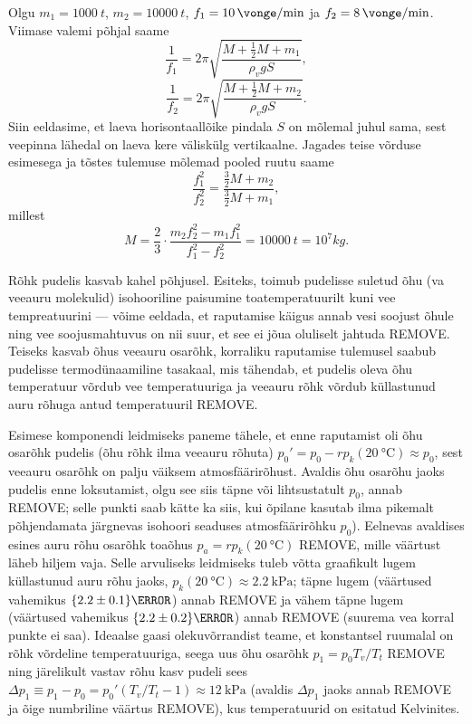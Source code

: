 \documentclass[10pt]{article}
\newcommand{\p}[1]{REMOVE}
\begin{document}
\DeclareSIUnit{}
Olgu $m_1=\SI{1000}{t}$, $m_2=\SI{10000}{t}$, $f_1=\SI{10}{\vonge \per \minute}$ ja $f_2=\SI{8}{\vonge \per \minute}$.
Viimase valemi põhjal saame
\[\frac{1}{f_1}=2\pi\sqrt{\frac{M+\frac{1}{2}M+m_1}{\rho_vgS}},\]
\[\frac{1}{f_2}=2\pi\sqrt{\frac{M+\frac{1}{2}M+m_2}{\rho_vgS}}.\]
Siin eeldasime, et laeva horisontaallõike pindala $S$ on mõlemal juhul sama, sest veepinna lähedal on laeva kere väliskülg vertikaalne.
Jagades teise võrduse esimesega ja tõstes tulemuse mõlemad pooled ruutu saame
\[\frac{f_1^2}{f_2^2}=\frac{\frac{3}{2}M+m_2}{\frac{3}{2}M+m_1},\]
millest
\[M=\frac{2}{3}\cdot\frac{m_2f_2^2-m_1f_1^2}{f_1^2-f_2^2}=\SI{10000}{t}=10^7\si{kg}.\]
\probend
\bigskip


\solu
Rõhk pudelis kasvab kahel põhjusel. Esiteks, toimub pudelisse suletud õhu (va veeauru molekulid) isohooriline paisumine toatemperatuurilt kuni vee tempreatuurini --- võime eeldada, et raputamise käigus annab vesi soojust õhule ning vee soojusmahtuvus on nii suur, et see ei jõua oluliselt jahtuda \p1. Teiseks kasvab õhus veeauru osarõhk, korraliku raputamise tulemusel saabub pudelisse termodünaamiline tasakaal, mis tähendab, et pudelis oleva õhu temperatuur võrdub vee temperatuuriga ja veeauru rõhk võrdub küllastunud auru rõhuga antud temperatuuril \p1.

Esimese komponendi leidmiseks paneme tähele, et enne raputamist oli õhu osarõhk pudelis (õhu rõhk ilma veeauru rõhuta) $p_0'=p_0-rp_k(\qty{20}\celsius)\approx p_0$, sest veeauru osarõhk on palju väiksem atmosfäärirõhust. Avaldis õhu osarõhu jaoks pudelis enne loksutamist, olgu see siis täpne või lihtsustatult $p_0$, annab \p1; selle punkti saab kätte ka siis, kui õpilane kasutab ilma pikemalt põhjendamata järgnevas isohoori seaduses atmosfäärirõhku $p_0$). Eelnevas avaldises esines auru rõhu osarõhk toaõhus $p_a=rp_k(\qty{20}\celsius)$ \p1, mille väärtust läheb hiljem vaja.  Selle arvuliseks leidmiseks tuleb võtta graafikult lugem küllastunud auru rõhu jaoks, $p_k(\qty{20}\celsius)\approx \qty{2.2}{\kPa}$; täpne lugem (väärtused vahemikus $\qty{2.2\pm 0.1}{\kPa}$) annab \p1 ja vähem täpne lugem (väärtused vahemikus $\qty{2.2\pm 0.2}{\kPa}$) annab \p{0,5} (suurema vea korral punkte ei saa). Ideaalse gaasi olekuvõrrandist teame, et konstantsel ruumalal on rõhk võrdeline temperatuuriga, seega uus õhu osarõhk $p_1= p_0T_v/T_t$ \p1 ning järelikult vastav rõhu kasv pudeli sees $\Delta p_1\equiv p_1-p_0=p_0'(T_v/T_t-1)\approx \SI{12}{\kPa}$ (avaldis $\Delta p_1$ jaoks annab \p1 ja õige numbriline väärtus \p1), kus temperatuurid on esitatud Kelvinites.
\end{document}
